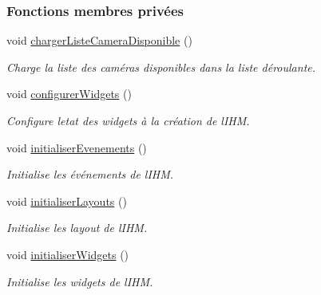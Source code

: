 \subsubsection*{Fonctions membres privées}
\begin{DoxyCompactItemize}
\item 
void \hyperlink{class_i_h_m_reglage_video_a0a480faa747bc705b4cf49df4ecc1d44}{charger\+Liste\+Camera\+Disponible} ()
\begin{DoxyCompactList}\small\item\em Charge la liste des caméras disponibles dans la liste déroulante. \end{DoxyCompactList}\item 
void \hyperlink{class_i_h_m_reglage_video_a2e51529e3a822121ae999e13da2180c6}{configurer\+Widgets} ()
\begin{DoxyCompactList}\small\item\em Configure l\textquotesingle{}etat des widgets à la création de l\textquotesingle{}I\+HM. \end{DoxyCompactList}\item 
void \hyperlink{class_i_h_m_reglage_video_a4576b1b6ccfcabf6b2b39d37db2dd248}{initialiser\+Evenements} ()
\begin{DoxyCompactList}\small\item\em Initialise les événements de l\textquotesingle{}I\+HM. \end{DoxyCompactList}\item 
void \hyperlink{class_i_h_m_reglage_video_a6efcf5e8c7dfd272ecb1398985f7332a}{initialiser\+Layouts} ()
\begin{DoxyCompactList}\small\item\em Initialise les layout de l\textquotesingle{}I\+HM. \end{DoxyCompactList}\item 
void \hyperlink{class_i_h_m_reglage_video_ad41172843e79eae9bb64048ec76b81e6}{initialiser\+Widgets} ()
\begin{DoxyCompactList}\small\item\em Initialise les widgets de l\textquotesingle{}I\+HM. \end{DoxyCompactList}\end{DoxyCompactItemize}
